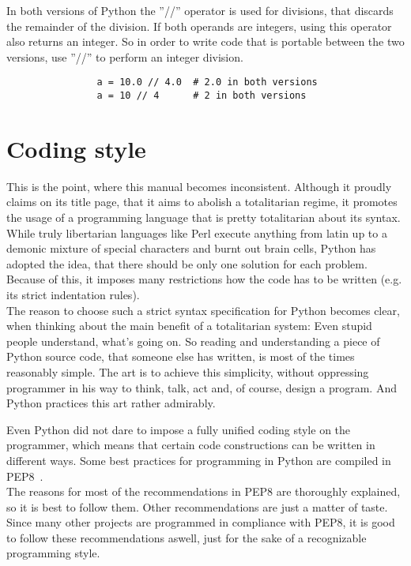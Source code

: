 			In both versions of Python the ''//'' operator is used for divisions, that discards the remainder of the division.
			If both operands are integers, using this operator also returns an integer.
			So in order to write code that is portable between the two versions, use ''//'' to perform an integer division.
			\begin{verbatim}
				a = 10.0 // 4.0  # 2.0 in both versions
				a = 10 // 4      # 2 in both versions
			\end{verbatim}


	\section{Coding style}
		This is the point, where this manual becomes inconsistent.
		Although it proudly claims on its title page, that it aims to abolish a totalitarian regime, it promotes the usage of a programming language that is pretty totalitarian about its syntax.\\
		While truly libertarian languages like Perl execute anything from latin up to a demonic mixture of special characters and burnt out brain cells, Python has adopted the idea, that there should be only one solution for each problem.
		Because of this, it imposes many restrictions how the code has to be written (e.g. its strict indentation rules).\\
		The reason to choose such a strict syntax specification for Python becomes clear, when thinking about the main benefit of a totalitarian system:
		Even stupid people understand, what's going on.
		So reading and understanding a piece of Python source code, that someone else has written, is most of the times reasonably simple.
		The art is to achieve this simplicity, without oppressing programmer in his way to think, talk, act and, of course, design a program.
		And Python practices this art rather admirably.

		Even Python did not dare to impose a fully unified coding style on the programmer, which means that certain code constructions can be written in different ways.
		Some best practices for programming in Python are compiled in PEP8~\cite{PEP8}.\\
		The reasons for most of the recommendations in PEP8 are thoroughly explained, so it is best to follow them.
		Other recommendations are just a matter of taste.
		Since many other projects are programmed in compliance with PEP8, it is good to follow these recommendations aswell, just for the sake of a recognizable programming style.

